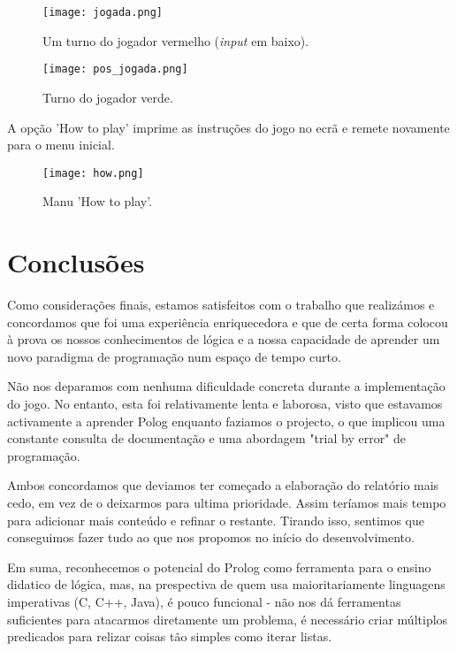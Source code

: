 \documentclass[a4paper]{article}
\begin{document}
\begin{figure}
\caption{Um turno do jogador vermelho (\textit{input} em baixo).}
\centering
\texttt{[image: jogada.png]}
\end{figure}

\begin{figure}
\caption{Turno do jogador verde.}
\centering
\texttt{[image: pos\_jogada.png]}
\end{figure}

A opção 'How to play' imprime as instruções do jogo no ecrã e remete novamente para o menu inicial.

\begin{figure}
\caption{Manu 'How to play'.}
\centering
\texttt{[image: how.png]}
\end{figure}



\section{Conclusões}
Como considerações finais, estamos satisfeitos com o trabalho que realizámos e concordamos que foi uma experiência enriquecedora e que de certa forma colocou à prova os nossos conhecimentos de lógica e a nossa capacidade de aprender um novo paradigma de programação num espaço de tempo curto.

Não nos deparamos com nenhuma dificuldade concreta durante a implementação do jogo. No entanto, esta foi relativamente lenta e laborosa, visto que estavamos activamente a aprender Polog enquanto faziamos o projecto, o que implicou uma constante consulta de documentação e uma abordagem "trial by error" de programação.

Ambos concordamos que deviamos ter começado a elaboração do relatório mais cedo, em vez de o deixarmos para ultima prioridade. Assim teríamos mais tempo para adicionar mais conteúdo e refinar o restante. Tirando isso, sentimos que conseguimos fazer tudo ao que nos propomos no início do desenvolvimento.

Em suma, reconhecemos o potencial do Prolog como ferramenta para o ensino didatico de lógica, mas, na prespectiva de quem usa maioritariamente linguagens imperativas (C, C++, Java), é pouco funcional - não nos dá ferramentas suficientes para atacarmos diretamente um problema, é necessário criar múltiplos predicados para relizar coisas tão simples como iterar listas.

\end{document}
